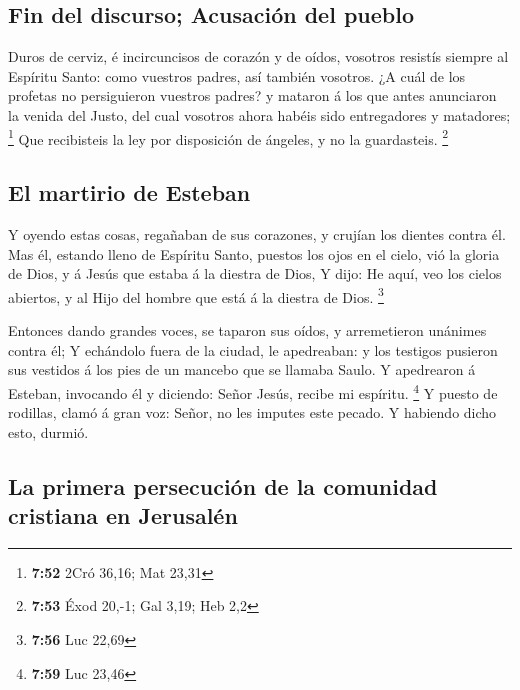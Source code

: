 \hypertarget{fin-del-discurso-acusaciuxf3n-del-pueblo}{%
\subsection{Fin del discurso; Acusación del
pueblo}\label{fin-del-discurso-acusaciuxf3n-del-pueblo}}

 Duros de cerviz, é incircuncisos de corazón y de oídos,
vosotros resistís siempre al Espíritu Santo: como vuestros padres, así
también vosotros.  ¿A cuál de los profetas no
persiguieron vuestros padres? y mataron á los que antes anunciaron la
venida del Justo, del cual vosotros ahora habéis sido entregadores y
matadores; \footnote{\textbf{7:52} 2Cró 36,16; Mat 23,31}
 Que recibisteis la ley por disposición de ángeles, y no
la guardasteis. \footnote{\textbf{7:53} Éxod 20,-1; Gal 3,19; Heb 2,2}

\hypertarget{el-martirio-de-esteban}{%
\subsection{El martirio de Esteban}\label{el-martirio-de-esteban}}

 Y oyendo estas cosas, regañaban de sus corazones, y
crujían los dientes contra él.  Mas él, estando lleno de
Espíritu Santo, puestos los ojos en el cielo, vió la gloria de Dios, y á
Jesús que estaba á la diestra de Dios,  Y dijo: He aquí,
veo los cielos abiertos, y al Hijo del hombre que está á la diestra de
Dios. \footnote{\textbf{7:56} Luc 22,69}

 Entonces dando grandes voces, se taparon sus oídos, y
arremetieron unánimes contra él;  Y echándolo fuera de la
ciudad, le apedreaban: y los testigos pusieron sus vestidos á los pies
de un mancebo que se llamaba Saulo.  Y apedrearon á
Esteban, invocando él y diciendo: Señor Jesús, recibe mi espíritu.
\footnote{\textbf{7:59} Luc 23,46}  Y puesto de rodillas,
clamó á gran voz: Señor, no les imputes este pecado. Y habiendo dicho
esto, durmió.

\hypertarget{la-primera-persecuciuxf3n-de-la-comunidad-cristiana-en-jerusaluxe9n}{%
\subsection{La primera persecución de la comunidad cristiana en
Jerusalén}\label{la-primera-persecuciuxf3n-de-la-comunidad-cristiana-en-jerusaluxe9n}}

